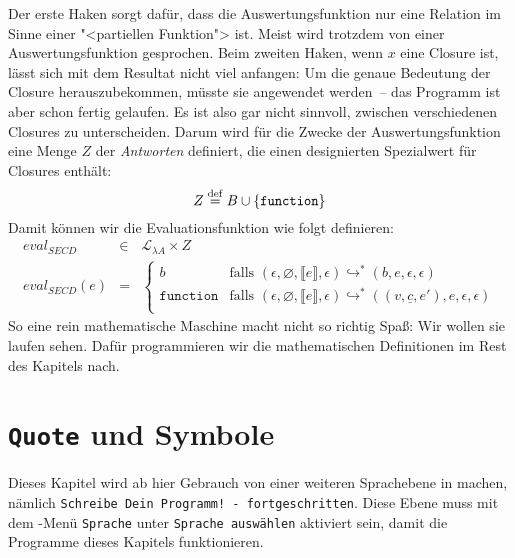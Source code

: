 %
Der erste Haken sorgt dafür, dass die Auswertungsfunktion nur eine
Relation im Sinne einer "<partiellen Funktion"> ist.  Meist wird
trotzdem von einer Auswertungsfunktion gesprochen.  Beim zweiten
Haken, wenn $x$ eine Closure ist, lässt sich mit dem Resultat nicht
viel anfangen: Um die genaue Bedeutung der Closure herauszubekommen,
müsste sie angewendet werden~-- das Programm ist aber schon fertig
gelaufen.  Es ist also gar nicht sinnvoll, zwischen verschiedenen
Closures zu unterscheiden.  Darum wird für die Zwecke der
Auswertungsfunktion eine Menge $Z$ der \textit{Antworten}
definiert, die einen designierten Spezialwert für Closures enthält:
%
\begin{displaymath}
  Z \stackrel{\rm def}{=}{} B \cup \{ \texttt{function} \}
\end{displaymath}
%
Damit können wir die Evaluationsfunktion wie folgt definieren:
%
\begin{eqnarray*}
  \mathit{eval}_\mathit{SECD} & \in & \mathcal{L}_{\lambda{}A} \times Z\\
  \mathit{eval}_\mathit{SECD}(e) & = &
  \begin{cases}
    b & \textrm{falls } (\epsilon, \varnothing, \llbracket e\rrbracket, \epsilon)
    \hookrightarrow^* (b, e, \epsilon, \epsilon)\\
    \texttt{function} & \textrm{falls } (\epsilon, \varnothing, \llbracket e\rrbracket, \epsilon)
    \hookrightarrow^* ((v, \underline{c}, e'), e, \epsilon, \epsilon)\\
  \end{cases}
\end{eqnarray*}
%
So eine rein mathematische Maschine macht nicht so richtig Spaß: Wir
wollen sie laufen sehen.  Dafür programmieren wir die mathematischen
Definitionen im Rest des Kapitels nach.

\section{\texttt{Quote} und Symbole}
\label{sec:quote}

Dieses Kapitel wird ab hier Gebrauch von einer weiteren
Sprachebene in
\drscheme{} machen, nämlich \texttt{Schreibe Dein Programm! -
  fortgeschritten}.  Diese Ebene muss mit dem \drscheme{}-Menü \texttt{Sprache}
unter \texttt{Sprache auswählen} aktiviert sein, damit die
Programme dieses Kapitels funktionieren.

